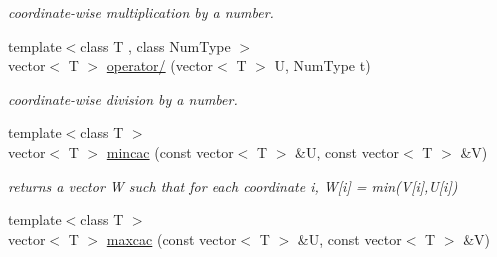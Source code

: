 \begin{DoxyCompactItemize}
\begin{DoxyCompactList}\small\item\em coordinate-\/wise multiplication by a number. \end{DoxyCompactList}\item 
\hypertarget{namespacedscr_a84c29850f717af09f7a142d086d09238}{{\footnotesize template$<$class T , class Num\-Type $>$ }\\vector$<$ T $>$ \hyperlink{namespacedscr_a84c29850f717af09f7a142d086d09238}{operator/} (vector$<$ T $>$ U, Num\-Type t)}\label{namespacedscr_a84c29850f717af09f7a142d086d09238}

\begin{DoxyCompactList}\small\item\em coordinate-\/wise division by a number. \end{DoxyCompactList}\item 
\hypertarget{namespacedscr_a022da6f55d4e4597f40becc1c158d778}{{\footnotesize template$<$class T $>$ }\\vector$<$ T $>$ \hyperlink{namespacedscr_a022da6f55d4e4597f40becc1c158d778}{mincac} (const vector$<$ T $>$ \&U, const vector$<$ T $>$ \&V)}\label{namespacedscr_a022da6f55d4e4597f40becc1c158d778}

\begin{DoxyCompactList}\small\item\em returns a vector W such that for each coordinate i, W\mbox{[}i\mbox{]} = min(\-V\mbox{[}i\mbox{]},\-U\mbox{[}i\mbox{]}) \end{DoxyCompactList}\item 
\hypertarget{namespacedscr_a70ad760aedd4cee63bb7570b9cf00d28}{{\footnotesize template$<$class T $>$ }\\vector$<$ T $>$ \hyperlink{namespacedscr_a70ad760aedd4cee63bb7570b9cf00d28}{maxcac} (const vector$<$ T $>$ \&U, const vector$<$ T $>$ \&V)}\label{namespacedscr_a70ad760aedd4cee63bb7570b9cf00d28}


\end{DoxyCompactItemize}
